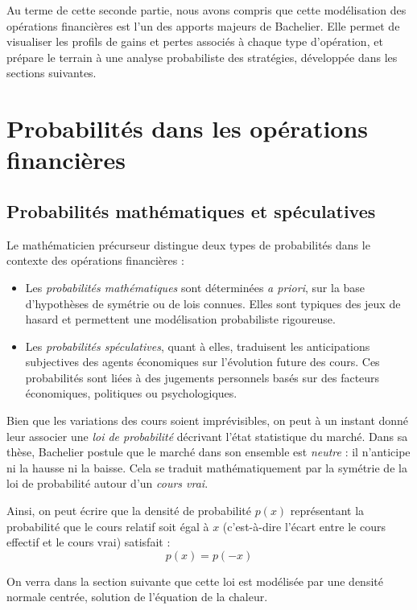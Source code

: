 \documentclass[12pt,a4paper]{article}
\begin{document}
\noindent
Au terme de cette seconde partie, nous avons compris que cette modélisation des opérations financières est l’un des apports majeurs de Bachelier. Elle permet de visualiser les profils de gains et pertes associés à chaque type d’opération, et prépare le terrain à une analyse probabiliste des stratégies, développée dans les sections suivantes.

\section{Probabilités dans les opérations financières}

\subsection{Probabilités mathématiques et spéculatives}

Le mathématicien précurseur distingue deux types de probabilités dans le contexte des opérations financières :

\begin{itemize}
    \item Les \textit{probabilités mathématiques} sont déterminées \textit{a priori}, sur la base d’hypothèses de symétrie ou de lois connues. Elles sont typiques des jeux de hasard et permettent une modélisation probabiliste rigoureuse.

    \item Les \textit{probabilités spéculatives}, quant à elles, traduisent les anticipations subjectives des agents économiques sur l’évolution future des cours. Ces probabilités sont liées à des jugements personnels basés sur des facteurs économiques, politiques ou psychologiques.
\end{itemize}

Bien que les variations des cours soient imprévisibles, on peut à un instant donné leur associer une \textit{loi de probabilité} décrivant l’état statistique du marché. Dans sa thèse, Bachelier postule que le marché dans son ensemble est \textit{neutre} : il n’anticipe ni la hausse ni la baisse. Cela se traduit mathématiquement par la symétrie de la loi de probabilité autour d’un \textit{cours vrai}.

Ainsi, on peut écrire que la densité de probabilité $p(x)$ représentant la probabilité que le cours relatif soit égal à $x$ (c’est-à-dire l’écart entre le cours effectif et le cours vrai) satisfait :
\[
p(x) = p(-x)
\]

On verra dans la section suivante que cette loi est modélisée par une densité normale centrée, solution de l'équation de la chaleur.\\
\end{document}
